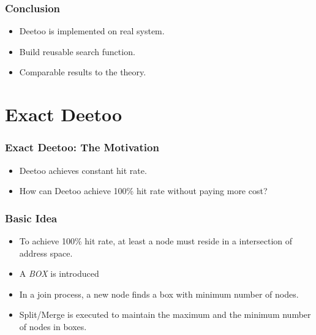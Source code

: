 \documentclass[red]{beamer}
\begin{document}
\begin{frame}
\frametitle{Conclusion}
\begin{itemize}
\item Deetoo is implemented on real system.
\item Build reusable search function.
\item Comparable results to the theory.
\end{itemize}
\end{frame}

\section{Exact Deetoo}

\begin{frame}
\frametitle{Exact Deetoo: The Motivation}
\begin{itemize}
\item Deetoo achieves constant hit rate.
\item How can Deetoo achieve 100\% hit rate without paying more cost?
\end{itemize}
\end{frame}

\begin{frame}
\frametitle{Basic Idea}
\begin{itemize}
\item To achieve 100\% hit rate, at least a node must reside in 
a intersection of address space.
\item A \textit{BOX} is introduced
\item In a join process, a new node finds a box with minimum number of nodes.
\item Split/Merge is executed to maintain the maximum and the minimum number of nodes in boxes.
\end{itemize}
\end{frame}
\end{document}
